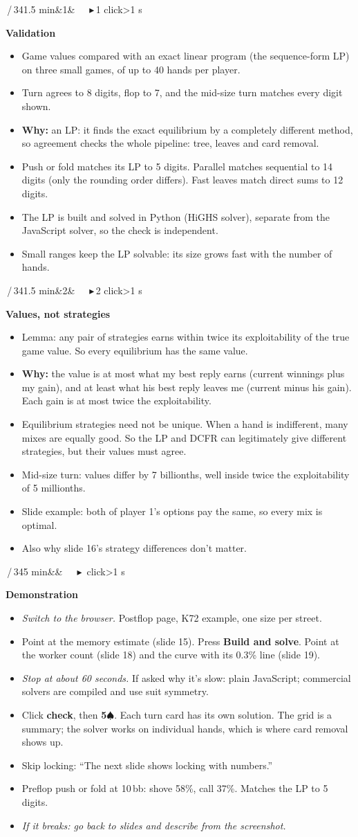 \documentclass{article}
\newcommand{\SP}{\ensuremath{\spadesuit}}
\newcommand{\slide}[4]{\clearpage
  \noindent\colorbox{bar}{\parbox{\dimexpr\linewidth-2\fboxsep}{\color{white}\fontsize{13}{15}\selectfont
  \textbf{\fontsize{21}{23}\selectfont #1}\,/\,34\hfill #3\ifx&#4&\else\ \ \ \textcolor{ck!40!white}{\ensuremath{\blacktriangleright}}\,#4 click\ifnum#4>1 s\fi\fi\\[2pt]
  \raggedright\textbf{\fontsize{15}{17.5}\selectfont #2}}}\par\vspace{5pt}
  \fontsize{15}{17.8}\selectfont\raggedright}
\newcommand{\pt}{\item[\textbullet]}
\newcommand{\ck}{\item[\textcolor{ck}{\ensuremath{\blacktriangleright}}]}
\newcommand{\why}{\textcolor{why}{\textbf{Why:}} }
\newcommand{\cue}[1]{{\color{dim}\itshape #1}}
\begin{document}
\slide{22}{Validation}{1.5 min}{1}
\begin{itemize}
\pt Game values compared with an exact linear program (the sequence-form LP) on three small games, of up to 40 hands per player.
\pt Turn agrees to 8 digits, flop to 7, and the mid-size turn matches every digit shown.
\pt \why an LP: it finds the exact equilibrium by a completely different method, so agreement checks the whole pipeline: tree, leaves and card removal.
\ck Push or fold matches its LP to 5 digits. Parallel matches sequential to 14 digits (only the rounding order differs). Fast leaves match direct sums to 12 digits.
\pt The LP is built and solved in Python (HiGHS solver), separate from the JavaScript solver, so the check is independent.
\pt Small ranges keep the LP solvable: its size grows fast with the number of hands.
\end{itemize}

\slide{23}{Values, not strategies}{1.5 min}{2}
\begin{itemize}
\pt Lemma: any pair of strategies earns within twice its exploitability of the true game value. So every equilibrium has the same value.
\ck \why the value is at most what my best reply earns (current winnings plus my gain), and at least what his best reply leaves me (current minus his gain). Each gain is at most twice the exploitability.
\ck Equilibrium strategies need not be unique. When a hand is indifferent, many mixes are equally good. So the LP and DCFR can legitimately give different strategies, but their values must agree.
\pt Mid-size turn: values differ by 7 billionths, well inside twice the exploitability of 5 millionths.
\pt Slide example: both of player 1's options pay the same, so every mix is optimal.
\pt Also why slide 16's strategy differences don't matter.
\end{itemize}

\slide{24}{Demonstration}{5 min}{}
\begin{itemize}
\pt \cue{Switch to the browser.} Postflop page, K72 example, one size per street.
\pt Point at the memory estimate (slide 15). Press \textbf{Build and solve}. Point at the worker count (slide 18) and the curve with its 0.3\% line (slide 19).
\pt \cue{Stop at about 60 seconds.} If asked why it's slow: plain JavaScript; commercial solvers are compiled and use suit symmetry.
\pt Click \textbf{check}, then \textbf{5\SP}. Each turn card has its own solution. The grid is a summary; the solver works on individual hands, which is where card removal shows up.
\pt Skip locking: ``The next slide shows locking with numbers.''
\pt Preflop push or fold at 10\,bb: shove 58\%, call 37\%. Matches the LP to 5 digits.
\pt \cue{If it breaks: go back to slides and describe from the screenshot.}
\end{itemize}
\end{document}
